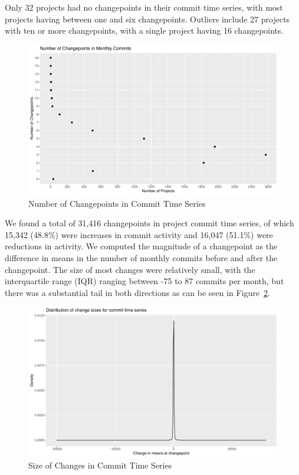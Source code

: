 \documentclass[10pt,conference]{IEEEtran}
\begin{document}
Only 32 projects had no changepoints in their commit time series, with most projects having between one and six changepoints. Outliers include 27 projects with ten or more changepoints, with a single project having 16 changepoints.
\begin{figure}[ht!]
    \centering
    \includegraphics[width=\linewidth]{commit-changepoints.pdf}
    \caption{Number of Changepoints in Commit Time Series}
    \label{fig:commitcpts}
\end{figure}

We found a total of 31,416 changepoints in project commit time series, of which 15,342 (48.8\%) were increases in commit activity and 16,047 (51.1\%) were reductions in activity. We computed the magnitude of a changepoint as the difference in means in the number of monthly commits before and after the changepoint. The size of most changes were relatively small, with the interquartile range (IQR) ranging between -75 to 87 commits per month, but there was a substantial tail in both directions as can be seen in Figure~\ref{fig:commitsizes}.
\begin{figure}[ht!]
    \centering
    \includegraphics[width=\linewidth]{commit-changesizes.pdf}
    \caption{Size of Changes in Commit Time Series}
    \label{fig:commitsizes}
\end{figure}
\end{document}

